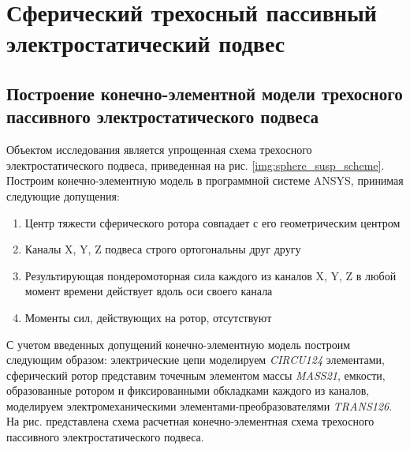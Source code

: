 \chapter{Сферический трехосный пассивный электростатический подвес} \label{chapt3}



\section{Построение конечно-элементной модели трехосного пассивного электростатического подвеса} \label{sect3_1}

Объектом исследования является упрощенная схема трехосного электростатического подвеса, приведенная на рис. \ref{img:sphere_susp_scheme}. Построим конечно-элементную модель в программной системе ANSYS, принимая следующие допущения:
\begin{enumerate}
  \item Центр тяжести сферического ротора совпадает с его геометрическим центром
  \item Каналы X, Y, Z подвеса строго ортогональны друг другу
  \item Результирующая пондеромоторная сила каждого из каналов X, Y, Z в любой момент времени действует вдоль оси своего канала
  \item Моменты сил, действующих на ротор, отсутствуют
\end{enumerate}

С учетом введенных допущений конечно-элементную модель построим следующим образом: электрические цепи моделируем \textit{CIRCU124} элементами, сферический ротор представим точечным элементом массы \textit{MASS21}, емкости, образованные ротором и фиксированными обкладками каждого из каналов, моделируем электромеханическими элементами-преобразователями \textit{TRANS126}. На рис. представлена схема расчетная конечно-элементная схема трехосного пассивного электростатического подвеса.

